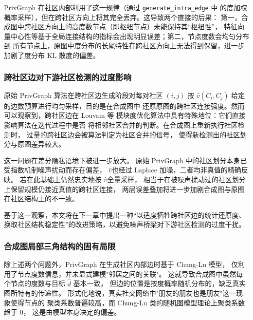 \par PrivGraph 在社区内部利用了这一规律（通过 \texttt{generate\_intra\_edge} 中
的度加权概率采样），但在跨社区方向上将其完全丢弃。这导致两个直接的后果：
第一，合成图中跨社区方向上的高度数节点（即枢纽节点）未能保持其``枢纽性''，
特征向量中心性等基于全局连接结构的指标会出现明显误差；第二，节点度数会均匀分布到
所有节点上，原图中度分布的长尾特性在跨社区方向上无法得到保留，进一步加剧了度分布 KL 散度的偏差。

\subsubsection{跨社区边对下游社区检测的过度影响}
\label{subsubsec:cross-overinfluence}

\par 原始 PrivGraph 算法在跨社区边生成阶段对每对社区 $(i, j)$ 按 
$\hat{v}(C_i, C_j)$ 给定的边数预算进行均匀采样，目的是在合成图中
还原原图的跨社区连接强度。然而可以观察到，跨社区边在 Louvain 等
模块度优化算法中具有特殊地位：它们直接影响算法在迭代过程中是否
将相邻社区合并的判断。在合成图上重新执行社区检测时，
过量的跨社区边会被算法判定为社区合并的信号，
使得新检测出的社区划分与原图差异较大。

\par 这一问题在差分隐私语境下被进一步放大。
原始 PrivGraph 中的社区划分本身已受指数机制噪声扰动而存在偏差，
$\hat{v}$也经过 Laplace 加噪，二者均非真值的精确反映。
若在此基础上仍然忠实地按 $\hat{v}$全量采样，
相当于在被噪声扰动过的社区划分上保留规模仍接近真值的跨社区连接，
两层误差叠加将进一步加剧合成图与原图在社区结构上的不一致。

\par 基于这一观察，本文将在下一章中提出一种``以适度牺牲跨社区边的统计还原度、
换取社区结构稳定性''的改进策略，以避免噪声桥梁对下游社区检测的过度干扰。

\subsubsection{合成图局部三角结构的固有局限}

\par 除上述两个问题外，PrivGraph 在生成社区内部边时基于 Chung-Lu 模型，
仅利用了节点度数信息，并未显式建模"邻居之间的关联"。
这就导致合成图中虽然每个节点的度数与目标 $\hat{d}$ 基本一致，
但边的位置是按度概率随机分布的，缺乏真实图所特有的传递性。
形式化地说，真实社交网络中"朋友的朋友也是朋友"这一现象使得节点的
聚类系数普遍较高，而 Chung-Lu 类的随机图模型理论上聚类系数趋于 $0$，
这是由模型本身决定的偏差。

